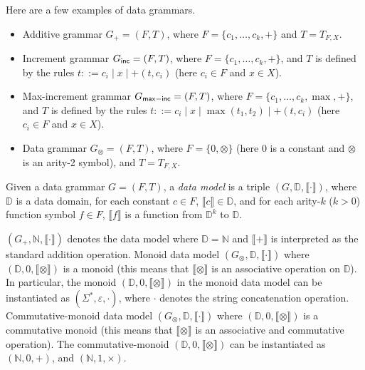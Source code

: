 \documentclass[runningheads,a4paper]{llncs}
\newcommand\dd{\mathbb{D}}
\newcommand\nat{\mathbb{N}}
\begin{document}
\begin{example}
Here are a few examples of data grammars.
\begin{itemize}
\item Additive grammar $G_+=(F, T)$, where $F=\{c_1,\dots, c_k, +\}$ and $T=T_{F,X}$. 

\item Increment grammar $G_{\sf inc} = (F, T)$, where $F=\{c_1,\dots, c_k, +\}$, and $T$ is defined by the rules $t ::= c_i \mid x \mid +(t, c_i)$ (here $c_i \in F$ and $x \in X$). 

\item Max-increment grammar $G_{\sf max-inc} = (F, T)$, where $F=\{c_1,\dots, c_k, \max, +\}$, and $T$ is defined by the rules $t ::= c_i \mid x \mid \max(t_1, t_2) \mid +(t,c_i)$ (here $c_i \in F$ and $x \in X$). 

\item Data grammar $G_\otimes = (F,T)$, where $F=\{0, \otimes\}$ (here $0$ is a constant and $\otimes$ is an arity-2 symbol), and $T=T_{F,X}$. 
\end{itemize}
\end{example}

Given a data grammar $G=(F, T)$, a \emph{data model} is a triple $(G, \dd, \llbracket \cdot \rrbracket)$, where $\dd$ is a data domain,  for each constant $c \in F$, $\llbracket c\rrbracket \in \dd$, and for each arity-$k$ ($k > 0$) function symbol $f \in F$, $\llbracket f \rrbracket $ is a function from $\dd^k$ to $\dd$. 

\begin{example}
$(G_+, \nat, \llbracket \cdot \rrbracket)$ denotes the data model where $\dd=\nat$ and $\llbracket + \rrbracket$ is interpreted as the standard addition operation. Monoid data model $(G_\otimes, \dd, \llbracket \cdot \rrbracket)$ where $(\dd, 0, \llbracket \otimes \rrbracket)$ is a monoid (this means that $ \llbracket \otimes \rrbracket$ is an associative operation on $\dd$). In particular, the monoid $(\dd, 0, \llbracket \otimes \rrbracket)$ in the monoid data model can be instantiated as $(\Sigma^\ast, \varepsilon, \cdot)$, where $\cdot$ denotes the string concatenation operation. Commutative-monoid data model $(G_\otimes, \dd, \llbracket \cdot \rrbracket)$ where $(\dd, 0, \llbracket \otimes \rrbracket)$ is a commutative monoid (this means that $\llbracket \otimes \rrbracket$ is an associative and commutative operation). The commutative-monoid  $(\dd, 0, \llbracket \otimes \rrbracket)$ can be instantiated as $(\nat, 0, +)$, and $(\nat, 1, \times)$. 
\end{example}
\end{document}
